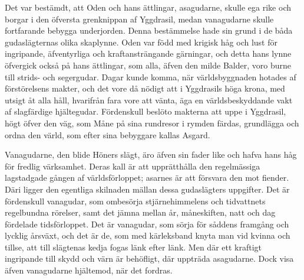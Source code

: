 
Det var bestämdt, att Oden och hans ättlingar, asagudarne, skulle ega
rike och borgar i den öfversta grenknippan af Yggdrasil, medan
vanagudarne skulle fortfarande bebygga underjorden. Denna bestämmelse
hade sin grund i de båda gudaslägternas olika skaplynne. Oden var född
med krigisk håg och lust för ingripande, äfventyrliga och
kraftansträngande gärningar, och detta hans lynne öfvergick också på
hans ättlingar, som alla, äfven den milde Balder, voro burne till
strids- och segergudar. Dagar kunde komma, när världsbyggnaden hotades
af förstörelsens makter, och det vore då nödigt att i Yggdrasils höga
krona, med utsigt åt alla håll, hvarifrån fara vore att vänta, äga en
världsbeskyddande vakt af slagfärdige hjältegudar. Fördenskull beslöto
makterna att uppe i Yggdrasil, högt öfver den väg, som Måne på sina
rundresor i rymden färdas, grundlägga och ordna den värld, som efter
sina bebyggare kallas Asgard.

Vanagudarne, den blide Höners slägt, äro äfven sin fader like och hafva
hans håg för fredlig värksamhet. Deras kall är att upprätthålla den
regelmässiga lagstadgade gången af världsförloppet; asarnes är att
försvara den mot fiender. Däri ligger den egentliga skilnaden mällan
dessa gudaslägters uppgifter. Det är fördenskull vanagudar, som
ombesörja stjärnehimmelens och tidvattnets regelbundna rörelser, samt
det jämna mellan år, måneskiften, natt och dag fördelade tidsförloppet.
Det är vanagudar, som sörja för såddens framgång och lycklig årsväxt,
och det är de, som med kärleksband knyta man vid kvinna och tillse, att
till slägtenas kedja fogas länk efter länk. Men där ett kraftigt
ingripande till skydd och värn är behöfligt, där uppträda asagudarne.
Dock visa äfven vanagudarne hjältemod, när det fordras.

